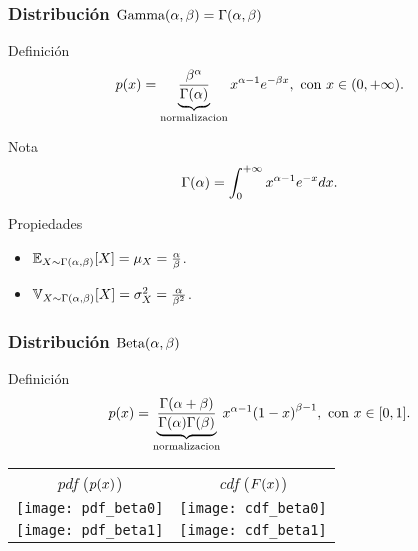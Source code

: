 \documentclass[table]{beamer}
\begin{document}
\begin{frame}
    \frametitle{Distribución $\text{Gamma} \parens{\alpha, \beta} = \gammadist{\alpha}{\beta}$}
    \begin{block}{Definición}
        \begin{equation*}
            \pdf{x} = \underbrace{\frac{\beta^{\alpha}}{\gammafunc{\alpha}}}_{\text{normalizacion}} x^{\alpha - 1} e^{- \beta x} ,
            \text{ con } x \in \parens{0, + \infty} .
        \end{equation*}
    \end{block}
    \begin{block}{Nota}
        \begin{equation*}
            \gammafunc{\alpha} = \int_{0}^{+ \infty} x^{\alpha - 1} e^{- x} d x .
        \end{equation*}
    \end{block}
    \begin{block}{Propiedades}
        \begin{itemize}
            \item $\expecteddist{X \sim \gammadist{\alpha}{\beta}}{X} = \mu_{X} = \frac{\alpha}{\beta}$.
            \item $\variancedist{X \sim \gammadist{\alpha}{\beta}}{X} = \sigma^{2}_{X} = \frac{\alpha}{\beta^{2}}$.
        \end{itemize}
    \end{block}
\end{frame}

\begin{frame}
    \frametitle{Distribución $\betadist{\alpha}{\beta}$}
    \begin{block}{Definición}
        \begin{equation*}
            \pdf{x} = \underbrace{\frac{\gammafunc{\alpha + \beta}}{\gammafunc{\alpha} \gammafunc{\beta}}}_{\text{normalizacion}} x^{\alpha - 1} \parens{1 - x}^{\beta- 1} ,
            \text{ con } x \in \sparens{0, 1} .
        \end{equation*}
    \end{block}
    \begin{center}
        \begin{tabular}{cc}
            \emph{pdf} ($\pdf{x}$) & \emph{cdf} ($\FF{x}$) \\
            \texttt{[image: pdf\_beta0]} &
            \texttt{[image: cdf\_beta0]} \\
            \texttt{[image: pdf\_beta1]} &
            \texttt{[image: cdf\_beta1]}
        \end{tabular}
    \end{center}
\end{frame}
\end{document}
